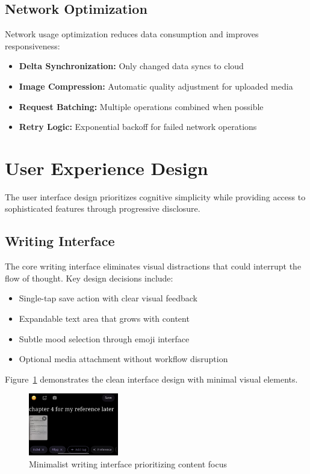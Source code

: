 \documentclass[conference]{IEEEtran}
\begin{document}
{\begin{IEEEkeywords}
\subsection{Network Optimization}

Network usage optimization reduces data consumption and improves responsiveness:

\begin{itemize}
\item \textbf{Delta Synchronization:} Only changed data syncs to cloud
\item \textbf{Image Compression:} Automatic quality adjustment for uploaded media
\item \textbf{Request Batching:} Multiple operations combined when possible
\item \textbf{Retry Logic:} Exponential backoff for failed network operations
\end{itemize}

\section{User Experience Design}

The user interface design prioritizes cognitive simplicity while providing access to sophisticated features through progressive disclosure.

\subsection{Writing Interface}

The core writing interface eliminates visual distractions that could interrupt the flow of thought. Key design decisions include:

\begin{itemize}
\item Single-tap save action with clear visual feedback
\item Expandable text area that grows with content
\item Subtle mood selection through emoji interface
\item Optional media attachment without workflow disruption
\end{itemize}

Figure~\ref{fig:writing-interface} demonstrates the clean interface design with minimal visual elements.

\begin{figure}[h]
\centering
\includegraphics[width=0.35\textwidth]{../THESIS-WRITING/files/imgs/prototype/journal_input_basic.jpeg}
\caption{Minimalist writing interface prioritizing content focus}
\label{fig:writing-interface}
\end{figure}


\end{IEEEkeywords}}
\end{document}
